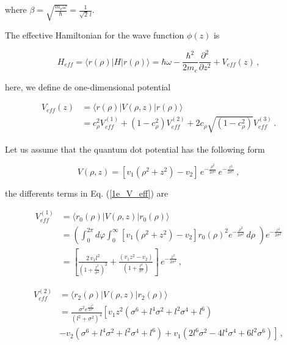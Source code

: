 \documentclass[a4paper,10pt]{article}
\begin{document}
\noindent where $\beta = \sqrt{\frac{m_e \omega}{\hbar}} = \frac{1}{\sqrt{2}\,l}$.

The effective Hamiltonian for the wave function $\phi(z)$ is

\begin{equation}
  H_{eff} = \langle r(\rho)|H|r(\rho)\rangle = \hbar \omega - \frac{\hbar^2}{2 m_e}\frac{\partial^2}{\partial z^2} + V_{eff}(z)\,,
\end{equation}

\noindent here, we define de one-dimensional potential

\begin{equation}\label{1e_V_eff}
  \begin{split}
  V_{eff}(z) &= \langle r(\rho)|V(\rho,z)|r(\rho)\rangle \\
             &= c_{\rho}^2 V_{eff}^{(1)} + (1-c_{\rho}^2) V_{eff}^{(2)} + 2c_{\rho}\sqrt{(1-c_{\rho}^2)} V_{eff}^{(3)}\,.
  \end{split}
\end{equation}

Let us assume that the quantum dot potential has the following form

\begin{equation}
  V(\rho,z) = \left[v_1\left(\rho^2+z^2 \right) - v_2 \right] \,e^{-\frac{\rho^2}{2\sigma^2}}\, e^{-\frac{z^2}{2\sigma^2}}\,,
\end{equation}

\noindent the differents terms in Eq. (\ref{1e_V_eff}) are

\begin{equation}
  \begin{split}
  V_{eff}^{(1)} &= \langle r_0(\rho) \lvert V(\rho,z) \lvert r_0(\rho) \rangle\\
             &= \left(\int_0^{2\pi}d\varphi\int_0^{\infty} \left[v_1\left(\rho^2+z^2 \right) - v_2 \right] r_0(\rho)^2 e^{-\frac{\rho^2}{2\sigma^2}}\,d\rho\,\,\right) e^{-\frac{z^2}{2\sigma^2}} \\
             &= \left[\frac{2\,v_1 l^2}{\left(1 + \frac{l^2}{\sigma^2}\right)^2} + \frac{(v_1 z^2 - v_2)}{\left(1 + \frac{l^2}{\sigma^2}\right)} \right]\, e^{-\frac{z^2}{2\sigma^2}}\, ,
  \end{split}
\end{equation}

\begin{equation}
  \begin{split}
    V_{eff}^{(2)} &= \langle r_2(\rho) \lvert V(\rho,z) \lvert r_2(\rho) \rangle \\
    &= \frac{\sigma^2 e^{\frac{-z^2}{2\sigma^2}}}{(l^2+\sigma^2)^4}\left[v_1 z^2 \left(\sigma^6 + l^4\sigma^2 + l^2\sigma^4 + l^6\right) \right.\\
    &\left.- v_2 \left( \sigma^6 + l^4 \sigma^2 + l^2 \sigma^4 + l^6 \right) +v_1\left( 2l^6\sigma^2 - 4 l^4\sigma^4 + 6l^2\sigma^6 \right) \right]\, ,
  \end{split}
\end{equation}
\end{document}

